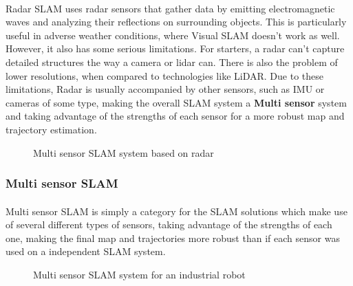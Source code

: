 \paragraph{}Radar SLAM uses radar sensors that gather data by emitting electromagnetic waves and analyzing their reflections on surrounding objects. This is particularly useful in adverse weather conditions, where Visual SLAM doesn't work as well\cite{hong2021radar}. However, it also has some serious limitations. For starters, a radar can't capture detailed structures the way a camera or lidar can. There is also the problem of lower resolutions, when compared to technologies like LiDAR\cite{radar_slam}. Due to these limitations, Radar is usually accompanied by other sensors, such as IMU or cameras of some type, making the overall SLAM system a \textbf{Multi sensor} system and taking advantage of the strengths of each sensor for a more robust map and trajectory estimation.
\begin{figure}[h]
    \centering
    
    \caption{Multi sensor SLAM system based on radar}
        \label{fig:enter-label}
\end{figure}

\subsubsection{Multi sensor SLAM}
\paragraph{}Multi sensor SLAM is simply a category for the \ac{SLAM} solutions which make use of several different types of sensors, taking advantage of the strengths of each one, making the final map and trajectories more robust than if each sensor was used on a independent \ac{SLAM} system.
\begin{figure}[h]
    \centering
    
    \caption{Multi sensor SLAM system for an industrial robot}
    \label{fig:enter-label}
\end{figure}

